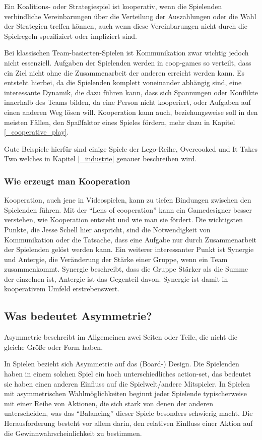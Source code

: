 Ein Koalitions- oder Strategiespiel ist kooperativ, wenn die Spielenden verbindliche Vereinbarungen über die Verteilung der Auszahlungen oder die Wahl der Strategien treffen können, auch wenn diese Vereinbarungen nicht durch die Spielregeln spezifiziert oder impliziert sind\cite{_introduction_to_the_theory_of_cooperative_games}.

Bei klassischen Team-basierten-Spielen ist Kommunikation zwar wichtig jedoch nicht essenziell. Aufgaben der Spielenden werden in coop-games so verteilt, dass ein Ziel nicht ohne die Zusammenarbeit der anderen erreicht werden kann. Es entsteht hierbei, da die Spielenden komplett voneinander abhängig sind, eine interessante Dynamik, die dazu führen kann, dass sich Spannungen oder Konflikte innerhalb des Teams bilden, da eine Person nicht kooperiert, oder Aufgaben auf einen anderen Weg lösen will. Kooperation kann auch, beziehungsweise soll in den meisten Fällen, den Spaßfaktor eines Spieles fördern, mehr dazu in Kapitel \ref{_cooperative_play}.

Gute Beispiele hierfür sind einige Spiele der Lego-Reihe, Overcooked und It Takes Two welches in Kapitel \ref{_industrie} genauer beschreiben wird.

\subsubsection{Wie erzeugt man Kooperation}
Kooperation, auch jene in Videospielen, kann zu tiefen Bindungen zwischen den Spielenden führen.
Mit der "`Lens of cooperation"'\cite[S. 311]{_gamemechanics_for_cooperative_games} kann ein Gamedesigner besser verstehen, wie Kooperation entsteht und wie man sie fördert. Die wichtigsten Punkte, die Jesse Schell hier anspricht, sind die Notwendigkeit von Kommunikation oder die Tatsache, dass eine Aufgabe nur durch Zusammenarbeit der Spielenden gelöst werden kann. Ein weiterer interessanter Punkt ist Synergie und Antergie, die Veränderung der Stärke einer Gruppe, wenn ein Team zusammenkommt. Synergie beschreibt, dass die Gruppe Stärker als die Summe der einzelnen ist, Antergie ist das Gegenteil davon. Synergie ist damit in kooperativem Umfeld erstrebenswert.

\subsection{Was bedeutet Asymmetrie?}

Asymmetrie beschreibt im Allgemeinen zwei Seiten oder Teile, die nicht die gleiche Größe oder Form haben\cite{_oxford_dict}.

In Spielen bezieht sich Asymmetrie auf das (Board-) Design. Die Spielenden haben in einem solchen Spiel ein hoch unterschiedliches action-set, das bedeutet sie haben einen anderen Einfluss auf die Spielwelt/andere Mitspieler. In Spielen mit asymmetrischen Wahlmöglichkeiten beginnt jeder Spielende typischerweise mit einer Reihe von Aktionen, die sich stark von denen der anderen unterscheiden, was das "`Balancing"' dieser Spiele besonders schwierig macht. Die Herausforderung besteht vor allem darin, den relativen Einfluss einer Aktion auf die Gewinnwahrscheinlichkeit zu bestimmen\cite[S. 18]{_balancing_asymmetric_video_games}.
